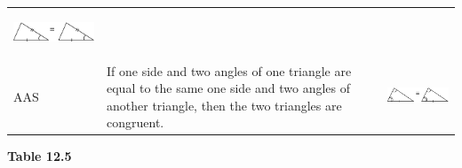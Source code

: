 \begin{center}
\begin{xtabular*}{\mytablewidth}[t]{|p{10\mystarwidth}|p{10\mystarwidth}|p{10\mystarwidth}|}
\begin{center}
    \label{m39368*id318143!!!underscore!!!media}\label{m39368*id318143!!!underscore!!!printimage}\includegraphics[width=.25\columnwidth]{col11306.imgs/m39368_MG10C13_033.png} %
      \vspace{2pt}
    \vspace{.1in}
    \end{center}    
     \tabularnewline{}
        AAS &
        If one side and two angles of one triangle are equal to the same one side and two angles of another triangle, then the two triangles are congruent. &
    \setcounter{subfigure}{0}
\label{m39368*id318178}
    \begin{center}
    \label{m39368*id318178!!!underscore!!!media}\label{m39368*id318178!!!underscore!!!printimage}\includegraphics[width=.25\columnwidth]{col11306.imgs/m39368_MG10C13_034.png} %
      \vspace{2pt}
    \vspace{.1in}
    \end{center}    
     \tabularnewline{}
    \end{xtabular*}
      \end{center}
    \begin{center}{\small\bfseries Table 12.5}\end{center}
    \par
        \label{m39368*uid48}
